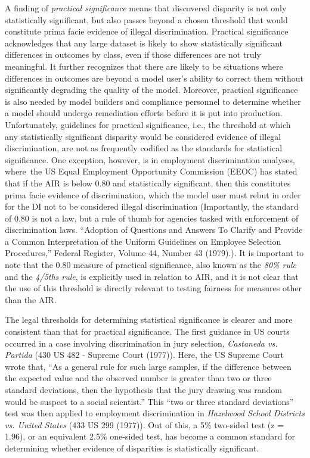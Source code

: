\documentclass[information,article,accept,moreauthors,pdftex]{Definitions/mdpi}
\begin{document}
{A finding of \textit{practical significance} means that discovered disparity is not only statistically significant, but also passes beyond a chosen threshold that would constitute {prima facie} evidence of illegal discrimination.  Practical significance acknowledges that any large dataset is likely to show statistically significant differences in outcomes by class, even if those differences are not truly meaningful.  It further recognizes that there are likely to be situations where differences in outcomes are beyond a model user’s ability to correct them without significantly degrading the quality of the model. Moreover, practical significance is also needed by model builders and compliance personnel to determine whether a model should undergo remediation efforts before it is put into production. Unfortunately, guidelines for practical significance, i.e., the threshold at which any statistically significant disparity would be considered evidence of illegal discrimination, are not as frequently codified as the standards for statistical significance.  One exception, however, is in employment discrimination analyses, where~the US Equal Employment Opportunity Commission (EEOC) has stated that if the AIR is below 0.80 and statistically significant, then this constitutes {prima facie} evidence of discrimination, which the model user must rebut in order for the DI not to be considered illegal discrimination ({Importantly, the standard of 0.80 is not a law, but a rule of thumb for agencies tasked with enforcement of discrimination laws.  ``Adoption of Questions and Answers To Clarify and Provide a Common Interpretation of the Uniform Guidelines on Employee Selection Procedures,'' Federal Register, Volume 44, Number 43 (1979).}). It is important to note that the 0.80 measure of practical significance, also known as the \textit{80\% rule} and the \textit{4/5ths rule}, is explicitly used in relation to AIR, and it is not clear that the use of this threshold is directly relevant to testing fairness for measures other than the AIR.

The legal thresholds for determining statistical significance is clearer and more consistent than that for practical significance.  The first guidance in US courts occurred in a case involving discrimination in jury selection, \textit{Castaneda vs. Partida} (430 US 482 - Supreme Court (1977)). Here, the US Supreme Court wrote that, ``As a general rule for such large samples, if the difference between the expected value and the observed number is greater than two or three standard deviations, then the hypothesis that the jury drawing was random would be suspect to a social scientist.''  This ``two or three standard deviations'' test was then applied to employment discrimination in \textit{Hazelwood School Districts vs. United States} (433 US 299 (1977)). Out of this, a 5\% two-sided test (z = 1.96), or an equivalent 2.5\% one-sided test, has become a common standard for determining whether evidence of disparities is statistically significant.

}
\end{document}
